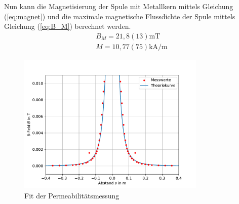\documentclass[11pt, a4paper]{article}
\begin{document}
    
    Nun kann die Magnetisierung der Spule mit Metallkern mittels Gleichung (\ref{eq:magnet}) und die maximale magnetische Flussdichte der Spule mittels Gleichung (\ref{eq:B_M}) berechnet werden.
   \begin{align}
        B_{M} = 21,8(13) \si{\milli\tesla} \\
        M = 10,77(75) \si{\kilo\ampere\per\metre}
    \end{align}
    \begin{figure}
        \centering
        \includegraphics[width=0.8\textwidth]{mur.pdf}
        \caption{Fit der Permeabilitätsmessung}
        \label{fig:murfit}
    \end{figure}
\end{document}
